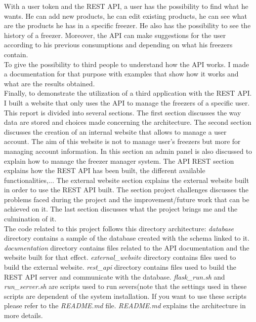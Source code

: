 With a user token and the REST API, a user has the possibility to find what he wants. He can add new products, he can edit existing products, he can see what are the products he has in a specific freezer. He also has the possibility to see the history of a freezer. Moreover, the API can make suggestions for the user according to his previous consumptions and depending on what his freezers contain.\\

To give the possibility to third people to understand how the API works. I made a documentation for that purpose with examples that show how it works and what are the results obtained. \\

Finally, to demonstrate the utilization of a third application with the REST API. I built a website that only uses the API to manage the freezers of a specific user.\\

This report is divided into several sections. The first section discusses the way data are stored and choices made concerning the architecture. The second section discusses the creation of an internal website that allows to manage a user account. The aim of this website is not to manage user's freezers but more for managing account information. In this section an admin panel is also discussed to explain how to manage the freezer manager system. The API REST section explains how the REST API has been built, the different available functionalities,... The external website section explains the external website built in order to use the REST API built. The section project challenges discusses the problems faced during the project and the improvement/future work that can be achieved on it. The last section discusses what the project brings me and the culmination of it.\\

The code related to this project follows this directory architecture:
\textit{database} directory contains a sample of the database created with the schema linked to it. \textit{documentation} directory contains files related to the API documentation and the website built for that effect. \textit{external\_website} directory contains files used to build the external website. \textit{rest\_api} directory contains files used to build the REST API server and communicate with the database. \textit{flask\_run.sh} and \textit{run\_server.sh} are scripts used to run severs(note that the settings used in these scripts are dependent of the system installation. If you want to use these scripts please refer to the \textit{README.md} file. \textit{README.md} explains the architecture in more details.


